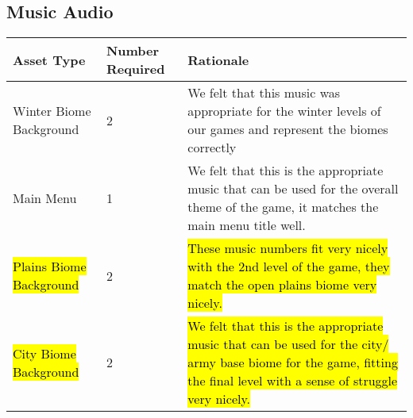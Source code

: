 \documentclass{article}
\begin{document}
\subsection{Music Audio}
\begin{center}
\begin{tabular}{ | m{5cm} | m{5cm}|m{5cm}|} 
\hline
Asset Type & Number Required & Rationale\\ 
\hline
Winter Biome Background & 2 & We felt that this music was appropriate for the winter levels of our games and represent the biomes correctly\\
\hline
Main Menu & 1 & We felt that this is the appropriate music that can be used for the overall theme of the game, it matches the main menu title well.\\
\hline
\hl{Plains Biome Background }& 2 & \hl{These music numbers fit very nicely with the 2nd level of the game, they match the open plains biome very nicely.}\\
\hline
\hl{City Biome Background }& 2 & \hl{We felt that this is the appropriate music that can be used for the city/ army base biome for the game, fitting the final level with a sense of struggle very nicely.}\\
\hline
\end{tabular}
\end{center}
\end{document}
